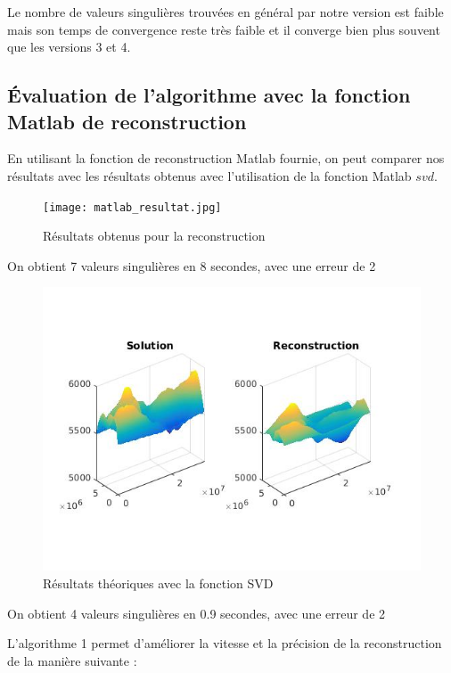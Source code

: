 \documentclass[fleqn]{article}
\begin{document}
Le nombre de valeurs singulières trouvées en général par notre version est faible mais son temps de convergence reste très faible et il converge bien plus souvent que les versions 3 et 4.






\pagebreak
\subsection{\'Evaluation de l'algorithme avec la fonction Matlab de reconstruction}

En utilisant la fonction de reconstruction Matlab fournie, on peut comparer nos résultats avec les résultats obtenus avec l'utilisation de la fonction Matlab $svd$.

\begin{figure}[h]
\centering
\texttt{[image: matlab\_resultat.jpg]}
\caption{Résultats obtenus pour la reconstruction}
\end{figure}

On obtient 7 valeurs singulières en 8 secondes, avec une erreur de 2%

\begin{figure}[h]
\centering
\includegraphics[scale = 0.4]{matlab_svd.jpg}
\caption{Résultats théoriques avec la fonction SVD}
\end{figure}

On obtient 4 valeurs singulières en 0.9 secondes, avec une erreur de 2%

L'algorithme 1 permet d'améliorer la vitesse et la précision de la reconstruction de la manière suivante :
\end{document}
